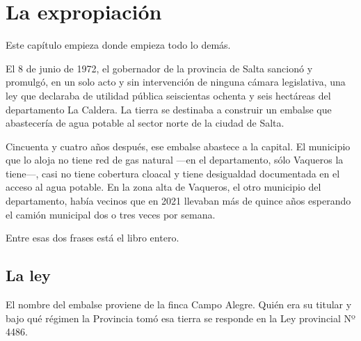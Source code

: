 \chapter{La expropiación}

\label{cap:expropiacion}

Este capítulo empieza donde empieza todo lo demás.

El 8 de junio de 1972, el gobernador de la provincia de Salta sancionó y promulgó, en un solo acto y sin intervención de ninguna cámara legislativa, una ley que declaraba de utilidad pública seiscientas ochenta y seis hectáreas del departamento La Caldera. La tierra se destinaba a construir un embalse que abastecería de agua potable al sector norte de la ciudad de Salta.

Cincuenta y cuatro años después, ese embalse abastece a la capital. El municipio que lo aloja no tiene red de gas natural ---en el departamento, sólo Vaqueros la tiene---, casi no tiene cobertura cloacal y tiene desigualdad documentada en el acceso al agua potable. En la zona alta de Vaqueros, el otro municipio del departamento, había vecinos que en 2021 llevaban más de quince años esperando el camión municipal dos o tres veces por semana.

Entre esas dos frases está el libro entero.

\section{La ley}

El nombre del embalse proviene de la finca Campo Alegre. Quién era su titular y bajo qué régimen la Provincia tomó esa tierra se responde en la Ley provincial Nº 4486.

